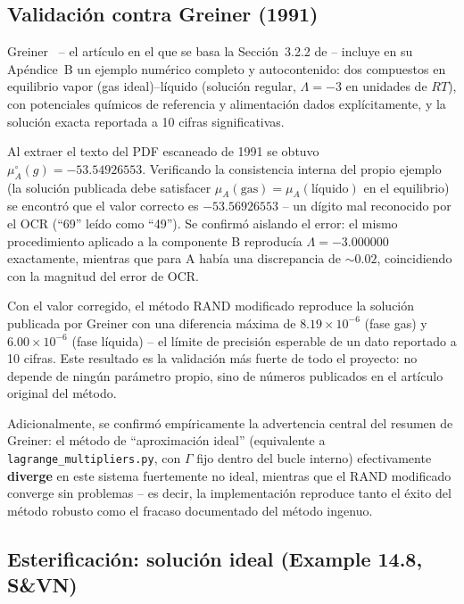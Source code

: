 \documentclass[11pt,a4paper]{article}
\begin{document}
\subsection{Validación contra Greiner (1991)}
\label{sec:validacion-greiner}

Greiner~\citep{greiner1991} -- el artículo en el que se basa la
Sección~3.2.2 de \citet{tsanas2018} -- incluye en su Apéndice~B un
ejemplo numérico completo y autocontenido: dos compuestos en equilibrio
vapor (gas ideal)--líquido (solución regular, $\Lambda=-3$ en unidades
de $RT$), con potenciales químicos de referencia y alimentación dados
explícitamente, y la solución exacta reportada a 10 cifras
significativas.

Al extraer el texto del PDF escaneado de 1991 se obtuvo
$\mu_A^{\circ}(g)=-53.54926553$. Verificando la consistencia interna
del propio ejemplo (la solución publicada debe satisfacer
$\mu_A(\text{gas})=\mu_A(\text{líquido})$ en el equilibrio) se encontró
que el valor correcto es $-53.56926553$ -- un dígito mal reconocido por
el OCR (``69'' leído como ``49''). Se confirmó aislando el error:
el mismo procedimiento aplicado a la componente B reproducía
$\Lambda=-3.000000$ exactamente, mientras que para A había una
discrepancia de $\sim 0.02$, coincidiendo con la magnitud del error de
OCR.

Con el valor corregido, el método RAND modificado reproduce la
solución publicada por Greiner con una diferencia máxima de
$8.19\times 10^{-6}$ (fase gas) y $6.00\times 10^{-6}$ (fase líquida) --
el límite de precisión esperable de un dato reportado a 10 cifras. Este
resultado es la validación más fuerte de todo el proyecto: no depende
de ningún parámetro propio, sino de números publicados en el artículo
original del método.

Adicionalmente, se confirmó empíricamente la advertencia central del
resumen de Greiner: el método de ``aproximación ideal'' (equivalente a
\texttt{lagrange\_multipliers.py}, con $\Gamma$ fijo dentro del bucle
interno) efectivamente \textbf{diverge} en este sistema fuertemente no
ideal, mientras que el RAND modificado converge sin problemas -- es
decir, la implementación reproduce tanto el éxito del método robusto
como el fracaso documentado del método ingenuo.

\subsection{Esterificación: solución ideal (Example 14.8, S\&VN)}
\label{sec:validacion-acetic}
\end{document}
